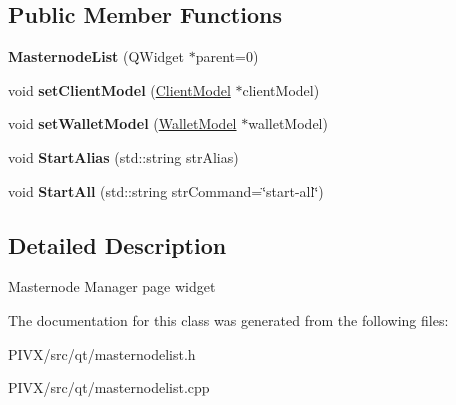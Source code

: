 \subsection*{Public Member Functions}
\begin{DoxyCompactItemize}
\item 
\mbox{\label{class_masternode_list_a341c2ce3e55eecb90f8733c72af375c4}} 
{\bfseries Masternode\+List} (Q\+Widget $\ast$parent=0)
\item 
\mbox{\label{class_masternode_list_af6885a9a952f5655079edc15c778281f}} 
void {\bfseries set\+Client\+Model} (\mbox{\hyperlink{class_client_model}{Client\+Model}} $\ast$client\+Model)
\item 
\mbox{\label{class_masternode_list_a42afb5ddc88eb11982f25b518f3477c6}} 
void {\bfseries set\+Wallet\+Model} (\mbox{\hyperlink{class_wallet_model}{Wallet\+Model}} $\ast$wallet\+Model)
\item 
\mbox{\label{class_masternode_list_ab3a42d1c66f3b28e9843335d8ce0178d}} 
void {\bfseries Start\+Alias} (std\+::string str\+Alias)
\item 
\mbox{\label{class_masternode_list_a0ebd5301adf7567e6a82550ba6d02ccc}} 
void {\bfseries Start\+All} (std\+::string str\+Command=\char`\"{}start-\/all\char`\"{})
\end{DoxyCompactItemize}


\subsection{Detailed Description}
Masternode Manager page widget 

The documentation for this class was generated from the following files\+:\begin{DoxyCompactItemize}
\item 
P\+I\+V\+X/src/qt/masternodelist.\+h\item 
P\+I\+V\+X/src/qt/masternodelist.\+cpp\end{DoxyCompactItemize}
